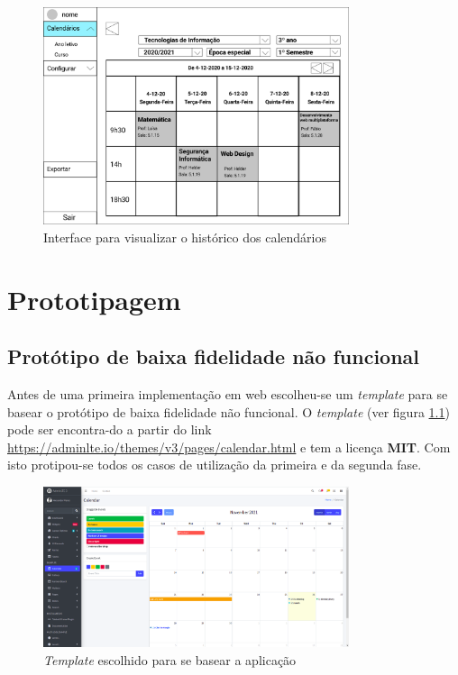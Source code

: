 \documentclass[11pt, twoside]{report}
\begin{document}
	\begin{figure}[H] 
	\centering 
	\includegraphics[width=0.8\textwidth,height=0.8\textheight,keepaspectratio]{image/prototipowireframes/calendariohistorico}
	\caption{Interface para visualizar o histórico dos calendários}
	\label{interfacehistorico}
\end{figure}

	
	\chapter{Prototipagem}
	
	\section{Protótipo de baixa fidelidade não funcional}
	\label{prototipobaixafidelidade}
	
	Antes de uma primeira implementação em web escolheu-se um \textit{template} para se basear o protótipo de baixa fidelidade não funcional. O \textit{template} (ver figura \ref{template}) pode ser encontra-do a partir do link \href{https://adminlte.io/themes/v3/pages/calendar.html}{https://adminlte.io/themes/v3/pages/calendar.html} e tem a licença \textbf{MIT}.
	Com isto protipou-se todos os casos de utilização da primeira e da segunda fase.
	
	\begin{figure}[H] 
		\centering 
		\includegraphics[width=0.8\textwidth,height=0.8\textheight,keepaspectratio]{image/template}
		\caption{\textit{Template} escolhido para se basear a aplicação}
		\label{template}
	\end{figure}
	
\end{document}
